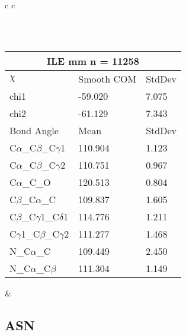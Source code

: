 \begin{longtable}{ c c }
\begin{tabular}{ l l l }
  \bottomrule
  \end{tabular}
  \\
  \begin{tabular}{ l l l }
  \toprule
  \multicolumn{3}{c}{ILE \textbf{mm} n = 11258} \\ \toprule
  $\chi$       & Smooth COM & StdDev \\ \midrule
  chi1 & -59.020 & 7.075 \\ 
  chi2 & -61.129 & 7.343 \\ \midrule
  Bond Angle   & Mean     & StdDev \\ \midrule
  C$\alpha$\_C$\beta$\_C$\gamma$1 & 110.904 & 1.123\\
  C$\alpha$\_C$\beta$\_C$\gamma$2 & 110.751 & 0.967\\
  C$\alpha$\_C\_O & 120.513 & 0.804\\
  C$\beta$\_C$\alpha$\_C & 109.837 & 1.605\\
  C$\beta$\_C$\gamma$1\_C$\delta$1 & 114.776 & 1.211\\
  C$\gamma$1\_C$\beta$\_C$\gamma$2 & 111.277 & 1.468\\
  N\_C$\alpha$\_C & 109.449 & 2.450\\
  N\_C$\alpha$\_C$\beta$ & 111.304 & 1.149\\
  \bottomrule
  \end{tabular}
  &
  \\
  
\end{longtable}    

\newpage
\subsection{ASN}

